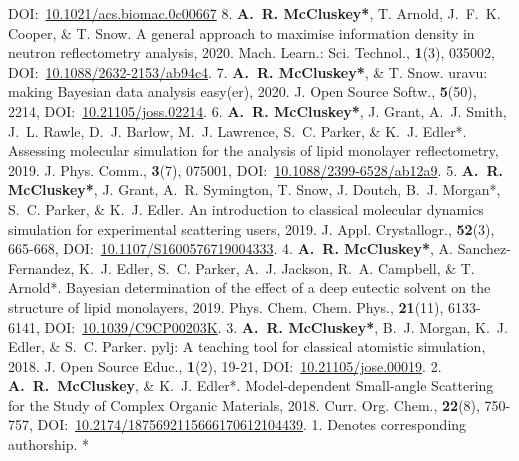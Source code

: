 \begin{cvpubys}
    {DOI:~\href{https://doi.org/10.1021/acs.biomac.0c00667}{10.1021/acs.biomac.0c00667}}
    {8.}
  \cvpuby
    {\textbf{A.~R. McCluskey*}, T. Arnold, J.~F.~K. Cooper, \& T. Snow.}
    {A general approach to maximise information density in neutron reflectometry analysis,}
    {2020.}
    {Mach. Learn.: Sci. Technol.,}
    {\textbf{1}(3), 035002,}
    {DOI:~\href{https://doi.org/10.1088/2632-2153/ab94c4}{10.1088/2632-2153/ab94c4}.}
    {7.}
  \cvpuby
    {\textbf{A.~R. McCluskey*}, \& T. Snow.}
    {uravu: making Bayesian data analysis easy(er),}
    {2020.}
    {J. Open Source Softw.,}
    {\textbf{5}(50), 2214,}
    {DOI:~\href{https://doi.org/10.21105/joss.02214}{10.21105/joss.02214}.}
    {6.}
  \cvpuby
    {\textbf{A.~R. McCluskey*}, J. Grant, A.~J. Smith, J.~L. Rawle, D.~J. Barlow, M.~J. Lawrence, S.~C. Parker, \& K.~J. Edler*.}
    {Assessing molecular simulation for the analysis of lipid monolayer reflectometry,}
    {2019.}
    {J. Phys. Comm.,}
    {\textbf{3}(7), 075001,}
    {DOI:~\href{https://doi.org/10.1088/2399-6528/ab12a9}{10.1088/2399-6528/ab12a9}.}
    {5.}
  \cvpuby
    {\textbf{A.~R. McCluskey*}, J. Grant, A.~R. Symington, T. Snow, J. Doutch, B.~J. Morgan*, S.~C. Parker, \& K.~J. Edler.}
    {An introduction to classical molecular dynamics simulation for experimental scattering users,}
    {2019.}
    {J. Appl. Crystallogr.,}
    {\textbf{52}(3), 665-668,}
    {DOI:~\href{https://doi.org/10.1107/S1600576719004333}{10.1107/S1600576719004333}.}
    {4.}
  \cvpuby
    {\textbf{A.~R. McCluskey*}, A. Sanchez-Fernandez, K.~J. Edler, S.~C. Parker, A.~J. Jackson, R.~A. Campbell, \& T. Arnold*.}
    {Bayesian determination of the effect of a deep eutectic solvent on the structure of lipid monolayers,}
    {2019.}
    {Phys. Chem. Chem. Phys.,}
    {\textbf{21}(11), 6133-6141,}
    {DOI:~\href{https://doi.org/10.1039/C9CP00203K}{10.1039/C9CP00203K}.}
    {3.}
  \cvpuby
    {\textbf{A.~R. McCluskey*}, B.~J. Morgan, K.~J. Edler, \& S.~C. Parker.}
    {pylj: A teaching tool for classical atomistic simulation,}
    {2018.}
    {J. Open Source Educ.,}
    {\textbf{1}(2), 19-21,}
    {DOI:~\href{http://doi.org/10.21105/jose.00019}{10.21105/jose.00019}.}
    {2.}
  \cvpuby
    {\textbf{A.~R.~McCluskey}, \& K.~J. Edler*.}
    {Model-dependent Small-angle Scattering for the Study of Complex Organic Materials,}
    {2018.}
    {Curr. Org. Chem.,}
    {\textbf{22}(8), 750-757,}
    {DOI:~\href{http://doi.org/10.2174/1875692115666170612104439}{10.2174/1875692115666170612104439}.}
    {1.}
  \cvpuby
    {Denotes corresponding authorship.}
    {}
    {}
    {}
    {}
    {}
    {*}
\end{cvpubys}
